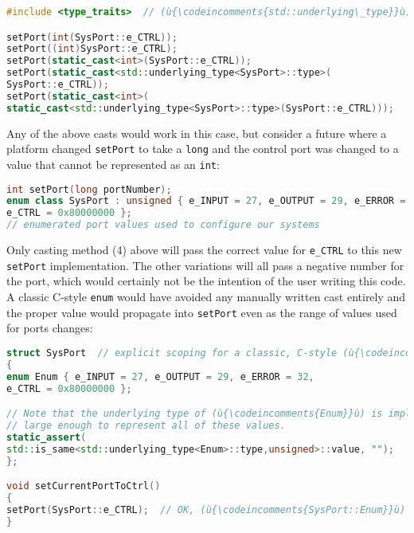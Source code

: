 \begin{lstlisting}[language=C++]
#include <type_traits>  // (ù{\codeincomments{std::underlying\_type}}ù)

setPort(int(SysPort::e_CTRL));                                           // (1)
setPort((int)SysPort::e_CTRL);                                           // (2)
setPort(static_cast<int>(SysPort::e_CTRL));                              // (3)
setPort(static_cast<std::underlying_type<SysPort>::type>(                // (4)
SysPort::e_CTRL));
setPort(static_cast<int>(                                                // (5)
static_cast<std::underlying_type<SysPort>::type>(SysPort::e_CTRL)));
\end{lstlisting}

\noindent Any of the above casts would work in this case, but consider a future
where a platform changed \texttt{setPort} to take a \texttt{long} and
the control port was changed to a value that cannot be represented as an
\texttt{int}:

\begin{lstlisting}[language=C++]
int setPort(long portNumber);
enum class SysPort : unsigned { e_INPUT = 27, e_OUTPUT = 29, e_ERROR = 32,
e_CTRL = 0x80000000 };
// enumerated port values used to configure our systems
\end{lstlisting}

\noindent Only casting method (4) above will pass the correct value for
\texttt{e\_CTRL} to this new \texttt{setPort} implementation. The other
variations will all pass a negative number for the port, which would
certainly not be the intention of the user writing this code. A classic
C-style \texttt{enum} would have avoided any manually written cast
entirely and the proper value would propagate into \texttt{setPort} even
as the range of values used for ports changes:

\begin{lstlisting}[language=C++]
struct SysPort  // explicit scoping for a classic, C-style (ù{\codeincomments{enum}}ù)
{
enum Enum { e_INPUT = 27, e_OUTPUT = 29, e_ERROR = 32,
e_CTRL = 0x80000000 };

// Note that the underlying type of (ù{\codeincomments{Enum}}ù) is implicit and will be
// large enough to represent all of these values.
static_assert(
std::is_same<std::underlying_type<Enum>::type,unsigned>::value, "");
};

void setCurrentPortToCtrl()
{
setPort(SysPort::e_CTRL);  // OK, (ù{\codeincomments{SysPort::Enum}}ù) promotes to (ù{\codeincomments{long}}ù).
}
\end{lstlisting}

